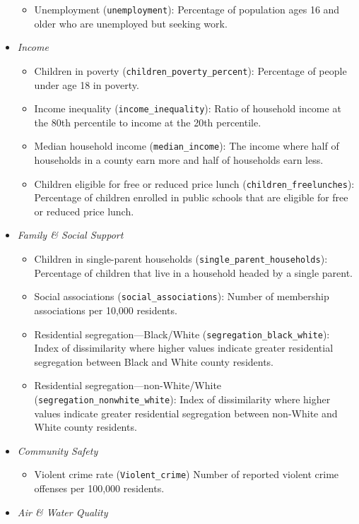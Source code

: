 \documentclass[
]{article}
\providecommand{\tightlist}{%
  \setlength{\itemsep}{0pt}\setlength{\parskip}{0pt}}
\begin{document}
\begin{itemize}
  \begin{itemize}
  \tightlist
  \item
    Unemployment (\texttt{unemployment}): Percentage of population ages 16 and older who are unemployed but seeking work.
  \end{itemize}
\item
  \emph{Income}

  \begin{itemize}
  \tightlist
  \item
    Children in poverty (\texttt{children\_poverty\_percent}): Percentage of people under age 18 in poverty.
  \item
    Income inequality (\texttt{income\_inequality}): Ratio of household income at the 80th percentile to income at the 20th percentile.
  \item
    Median household income (\texttt{median\_income}): The income where half of households in a county earn more and half of households earn less.
  \item
    Children eligible for free or reduced price lunch (\texttt{children\_freelunches}): Percentage of children enrolled in public schools that are eligible for free or reduced price lunch.
  \end{itemize}
\item
  \emph{Family \& Social Support}

  \begin{itemize}
  \tightlist
  \item
    Children in single-parent households (\texttt{single\_parent\_households}): Percentage of children that live in a household headed by a single parent.
  \item
    Social associations (\texttt{social\_associations}): Number of membership associations per 10,000 residents.
  \item
    Residential segregation---Black/White (\texttt{segregation\_black\_white}): Index of dissimilarity where higher values indicate greater residential segregation between Black and White county residents.
  \item
    Residential segregation---non-White/White (\texttt{segregation\_nonwhite\_white}): Index of dissimilarity where higher values indicate greater residential segregation between non-White and White county residents.
  \end{itemize}
\item
  \emph{Community Safety}

  \begin{itemize}
  \tightlist
  \item
    Violent crime rate (\texttt{Violent\_crime}) Number of reported violent crime offenses per 100,000 residents.
  \end{itemize}
\item
  \emph{Air \& Water Quality}


\end{itemize}
\end{document}
